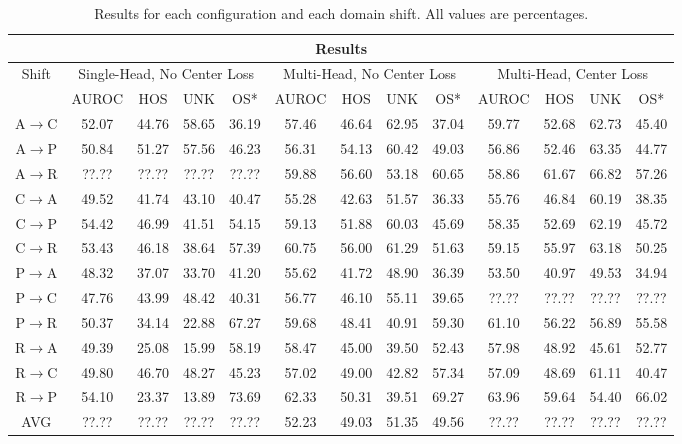 \documentclass[10pt,twocolumn,letterpaper]{article}
\begin{document}
\begin{table}
  \centering
  \begin{tabular}[t]{||c||c|c|c|c||c|c|c|c||c|c|c|c||}
    \hline
    \multicolumn{13}{||c||}{Results} \\
    \hline
    \multirow{2}{*}{Shift}   & \multicolumn{4}{|c||}{Single-Head, No Center Loss} & \multicolumn{4}{|c||}{Multi-Head, No Center Loss} & \multicolumn{4}{|c||}{Multi-Head, Center Loss} \\
            & AUROC & HOS   & UNK   & OS*   & AUROC & HOS   & UNK   & OS*   & AUROC & HOS   & UNK   & OS*   \\
    \hline
    A$\to$C & 52.07 & 44.76 & 58.65 & 36.19 & 57.46 & 46.64 & 62.95 & 37.04 & 59.77 & 52.68 & 62.73 & 45.40 \\
    A$\to$P & 50.84 & 51.27 & 57.56 & 46.23 & 56.31 & 54.13 & 60.42 & 49.03 & 56.86 & 52.46 & 63.35 & 44.77 \\
    A$\to$R & ??.?? & ??.?? & ??.?? & ??.?? & 59.88 & 56.60 & 53.18 & 60.65 & 58.86 & 61.67 & 66.82 & 57.26 \\
    C$\to$A & 49.52 & 41.74 & 43.10 & 40.47 & 55.28 & 42.63 & 51.57 & 36.33 & 55.76 & 46.84 & 60.19 & 38.35 \\
    C$\to$P & 54.42 & 46.99 & 41.51 & 54.15 & 59.13 & 51.88 & 60.03 & 45.69 & 58.35 & 52.69 & 62.19 & 45.72 \\
    C$\to$R & 53.43 & 46.18 & 38.64 & 57.39 & 60.75 & 56.00 & 61.29 & 51.63 & 59.15 & 55.97 & 63.18 & 50.25 \\
    P$\to$A & 48.32 & 37.07 & 33.70 & 41.20 & 55.62 & 41.72 & 48.90 & 36.39 & 53.50 & 40.97 & 49.53 & 34.94 \\
    P$\to$C & 47.76 & 43.99 & 48.42 & 40.31 & 56.77 & 46.10 & 55.11 & 39.65 & ??.?? & ??.?? & ??.?? & ??.?? \\
    P$\to$R & 50.37 & 34.14 & 22.88 & 67.27 & 59.68 & 48.41 & 40.91 & 59.30 & 61.10 & 56.22 & 56.89 & 55.58 \\
    R$\to$A & 49.39 & 25.08 & 15.99 & 58.19 & 58.47 & 45.00 & 39.50 & 52.43 & 57.98 & 48.92 & 45.61 & 52.77 \\
    R$\to$C & 49.80 & 46.70 & 48.27 & 45.23 & 57.02 & 49.00 & 42.82 & 57.34 & 57.09 & 48.69 & 61.11 & 40.47 \\
    R$\to$P & 54.10 & 23.37 & 13.89 & 73.69 & 62.33 & 50.31 & 39.51 & 69.27 & 63.96 & 59.64 & 54.40 & 66.02 \\
    \hline
    AVG     & ??.?? & ??.?? & ??.?? & ??.?? & 52.23 & 49.03 & 51.35 & 49.56 & ??.?? & ??.?? & ??.?? & ??.?? \\ 
    \hline
  \end{tabular}
  \caption{\centering\label{tab:results}Results for each configuration and each domain shift. All values are percentages.}
\end{table}
\end{document}
